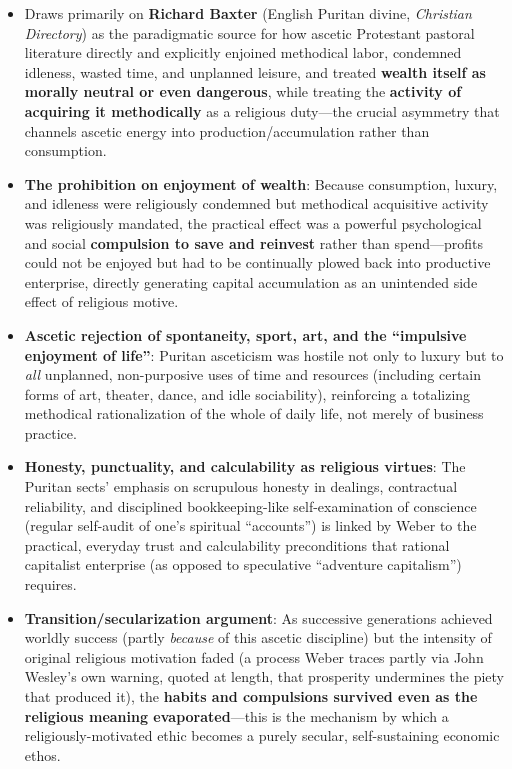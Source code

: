 \documentclass[12pt]{article}
\begin{document}
\begin{itemize}[leftmargin=*, itemsep=4pt]
    \item Draws primarily on \textbf{Richard Baxter} (English Puritan divine, \textit{Christian Directory}) as the paradigmatic source for how ascetic Protestant pastoral literature directly and explicitly enjoined methodical labor, condemned idleness, wasted time, and unplanned leisure, and treated \textbf{wealth itself as morally neutral or even dangerous}, while treating the \textbf{activity of acquiring it methodically} as a religious duty---the crucial asymmetry that channels ascetic energy into production/accumulation rather than consumption.
    \item \textbf{The prohibition on enjoyment of wealth}: Because consumption, luxury, and idleness were religiously condemned but methodical acquisitive activity was religiously mandated, the practical effect was a powerful psychological and social \textbf{compulsion to save and reinvest} rather than spend---profits could not be enjoyed but had to be continually plowed back into productive enterprise, directly generating capital accumulation as an unintended side effect of religious motive.
    \item \textbf{Ascetic rejection of spontaneity, sport, art, and the ``impulsive enjoyment of life''}: Puritan asceticism was hostile not only to luxury but to \emph{all} unplanned, non-purposive uses of time and resources (including certain forms of art, theater, dance, and idle sociability), reinforcing a totalizing methodical rationalization of the whole of daily life, not merely of business practice.
    \item \textbf{Honesty, punctuality, and calculability as religious virtues}: The Puritan sects' emphasis on scrupulous honesty in dealings, contractual reliability, and disciplined bookkeeping-like self-examination of conscience (regular self-audit of one's spiritual ``accounts'') is linked by Weber to the practical, everyday trust and calculability preconditions that rational capitalist enterprise (as opposed to speculative ``adventure capitalism'') requires.
    \item \textbf{Transition/secularization argument}: As successive generations achieved worldly success (partly \emph{because} of this ascetic discipline) but the intensity of original religious motivation faded (a process Weber traces partly via John Wesley's own warning, quoted at length, that prosperity undermines the piety that produced it), the \textbf{habits and compulsions survived even as the religious meaning evaporated}---this is the mechanism by which a religiously-motivated ethic becomes a purely secular, self-sustaining economic ethos.

\end{itemize}
\end{document}
